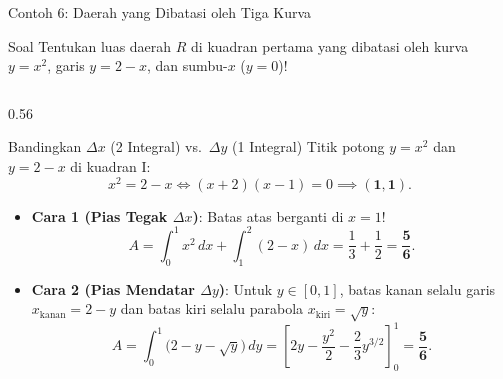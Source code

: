 \documentclass[aspectratio=43,10pt]{beamer}
\begin{document}
\begin{frame}{Contoh 6: Daerah yang Dibatasi oleh Tiga Kurva}
    \begin{exampleblock}{Soal}
        \scriptsize
        Tentukan luas daerah $R$ di kuadran pertama yang dibatasi oleh kurva $y = x^2$, garis $y = 2 - x$, dan sumbu-$x$ ($y = 0$)!
    \end{exampleblock}

    \begin{columns}[c]
        \begin{column}{0.56\textwidth}
            \begin{block}{Bandingkan $\Delta x$ (2 Integral) vs.\ $\Delta y$ (1 Integral)}
                \scriptsize\abovedisplayskip=2pt\belowdisplayskip=2pt
                Titik potong $y = x^2$ dan $y = 2 - x$ di kuadran I:
                $$x^2 = 2 - x \iff (x + 2)(x - 1) = 0 \implies \mathbf{(1, 1)}.$$
                \begin{itemize}\itemsep=2pt
                    \item \textbf{Cara 1 (Pias Tegak $\Delta x$)}: Batas atas berganti di $x = 1$!
                    $$A = \int_{0}^{1} x^2\,dx + \int_{1}^{2} (2 - x)\,dx = \frac{1}{3} + \frac{1}{2} = \mathbf{\frac{5}{6}}.$$
                    \item \textbf{Cara 2 (Pias Mendatar $\Delta y$)}: Untuk $y \in [0, 1]$, batas kanan selalu garis $x_{\text{kanan}} = 2 - y$ dan batas kiri selalu parabola $x_{\text{kiri}} = \sqrt{y}$:
                    $$A = \int_{0}^{1} \!\big(2 - y - \sqrt{y}\big)\,dy = \left[2y - \frac{y^2}{2} - \frac{2}{3}y^{3/2}\right]_{0}^{1}\! = \mathbf{\frac{5}{6}}.$$
                \end{itemize}
            \end{block}
        \end{column}


\end{columns}
\end{frame}
\end{document}
